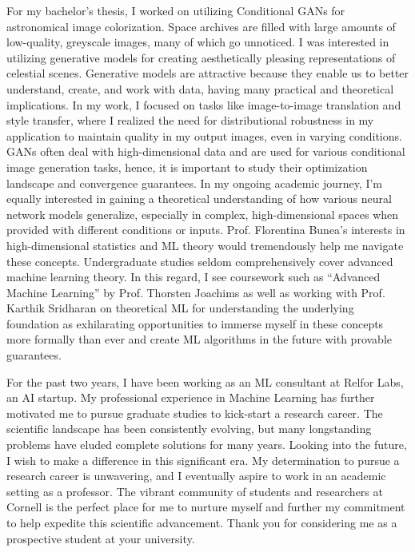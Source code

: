 \documentclass{article}
\begin{document}
\vspace{5pt} 
\hspace{0.25in}For my bachelor’s thesis, I worked on utilizing Conditional GANs
for astronomical image colorization. Space archives are filled with large
amounts of low-quality, greyscale images, many of which go unnoticed. I was
interested in utilizing generative models for creating aesthetically pleasing
representations of celestial scenes. Generative models are attractive because
they enable us to better understand, create, and work with data, having many
practical and theoretical implications. In my work, I focused on tasks like
image-to-image translation and style transfer, where I realized the need for
distributional robustness in my application to maintain quality in my output
images, even in varying conditions. GANs often deal with high-dimensional data
and are used for various conditional image generation tasks, hence, it is
important to study their optimization landscape and convergence guarantees. In
my ongoing academic journey, I’m equally interested in gaining a theoretical
understanding of how various neural network models generalize, especially in
complex, high-dimensional spaces when provided with different conditions or
inputs. Prof. Florentina Bunea’s interests in high-dimensional statistics and ML
theory would tremendously help me navigate these concepts. Undergraduate studies
seldom comprehensively cover advanced machine learning theory. In this regard, I
see coursework such as “Advanced Machine Learning” by Prof. Thorsten Joachims as
well as working with Prof. Karthik Sridharan on theoretical ML for understanding
the underlying foundation as exhilarating opportunities to immerse myself in
these concepts more formally than ever and create ML algorithms in the future
with provable guarantees.

\vspace{5pt} 
\hspace{0.25in}For the past two years, I have been working as an ML consultant
at Relfor Labs, an AI startup. My professional experience in Machine Learning
has further motivated me to pursue graduate studies to kick-start a research
career. The scientific landscape has been consistently evolving, but many
longstanding problems have eluded complete solutions for many years. Looking
into the future, I wish to make a difference in this significant era. My
determination to pursue a research career is unwavering, and I eventually aspire
to work in an academic setting as a professor. The vibrant community of students
and researchers at Cornell is the perfect place for me to nurture myself and
further my commitment to help expedite this scientific advancement. Thank you
for considering me as a prospective student at your university.
\end{document}
